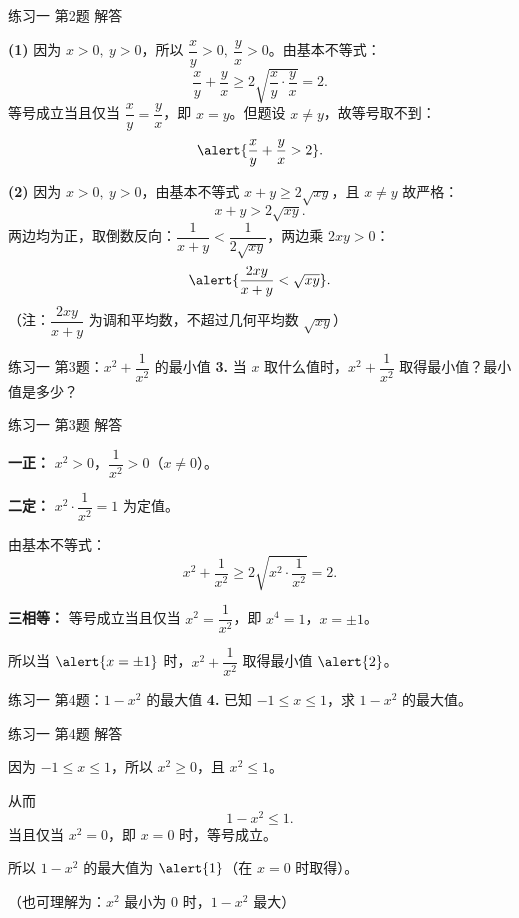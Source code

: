 \documentclass[10pt,aspectratio=169,serif]{beamer}
\begin{document}
\begin{frame}[t]{练习一 第2题 解答}
\begin{tcolorbox}[colback=orange!10,colframe=orange,title=\textbf{证明}]
\textbf{(1)} 因为 $x>0,\ y>0$，所以 $\dfrac{x}{y}>0,\ \dfrac{y}{x}>0$。由基本不等式：
\[
\frac{x}{y}+\frac{y}{x} \ge 2\sqrt{\frac{x}{y}\cdot\frac{y}{x}}=2.
\]
等号成立当且仅当 $\dfrac{x}{y}=\dfrac{y}{x}$，即 $x=y$。但题设 $x\ne y$，故等号取不到：
\[
\alert{\frac{x}{y}+\frac{y}{x}>2}.
\]

\vspace{0.5em}
\textbf{(2)} 因为 $x>0,\ y>0$，由基本不等式 $x+y\ge 2\sqrt{xy}$，且 $x\ne y$ 故严格：
\[
x+y > 2\sqrt{xy}.
\]
两边均为正，取倒数反向：$\dfrac{1}{x+y}<\dfrac{1}{2\sqrt{xy}}$，两边乘 $2xy>0$：
\[
\alert{\frac{2xy}{x+y}<\sqrt{xy}}.
\]
\small（注：$\dfrac{2xy}{x+y}$ 为调和平均数，不超过几何平均数 $\sqrt{xy}$）
\end{tcolorbox}
\end{frame}

\begin{frame}[t]{练习一 第3题：$x^2+\dfrac{1}{x^2}$ 的最小值}
\textbf{3.} 当 $x$ 取什么值时，$x^2+\dfrac{1}{x^2}$ 取得最小值？最小值是多少？
\end{frame}

\begin{frame}[t]{练习一 第3题 解答}
\begin{tcolorbox}[colback=orange!10,colframe=orange,title=\textbf{解}]
\textbf{一正：} $x^2>0$，$\dfrac{1}{x^2}>0$（$x\ne 0$）。

\textbf{二定：} $x^2\cdot\dfrac{1}{x^2}=1$ 为定值。

由基本不等式：
\[
x^2+\frac{1}{x^2} \ge 2\sqrt{x^2\cdot\frac{1}{x^2}}=2.
\]

\textbf{三相等：} 等号成立当且仅当 $x^2=\dfrac{1}{x^2}$，即 $x^4=1$，$x=\pm 1$。

\vspace{0.5em}
所以当 $\alert{x=\pm 1}$ 时，$x^2+\dfrac{1}{x^2}$ 取得最小值 $\alert{2}$。
\end{tcolorbox}
\end{frame}

\begin{frame}[t]{练习一 第4题：$1-x^2$ 的最大值}
\textbf{4.} 已知 $-1\le x\le 1$，求 $1-x^2$ 的最大值。
\end{frame}

\begin{frame}[t]{练习一 第4题 解答}
\begin{tcolorbox}[colback=orange!10,colframe=orange,title=\textbf{解}]
因为 $-1\le x\le 1$，所以 $x^2\ge 0$，且 $x^2\le 1$。

从而
\[
1-x^2 \le 1.
\]
当且仅当 $x^2=0$，即 $x=0$ 时，等号成立。

\vspace{0.5em}
所以 $1-x^2$ 的最大值为 $\alert{1}$（在 $x=0$ 时取得）。

\vspace{0.5em}
\small（也可理解为：$x^2$ 最小为 $0$ 时，$1-x^2$ 最大）
\end{tcolorbox}
\end{frame}
\end{document}
